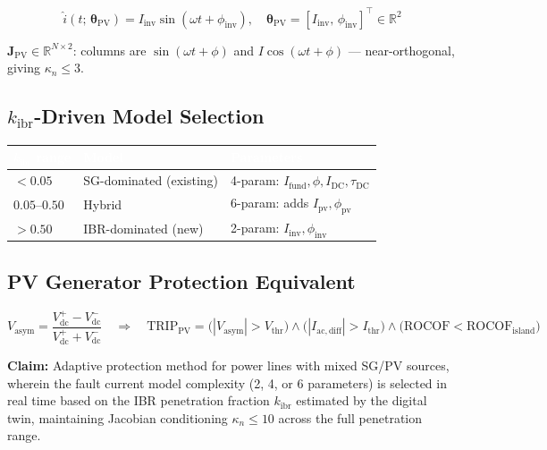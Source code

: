 \documentclass[12pt, a4paper]{report}
\newcommand{\vect}[1]{\boldsymbol{#1}}
\newcommand{\mat}[1]{\mathbf{#1}}
\begin{document}
\begin{equation}
  \hat{i}(t;\,\vect{\theta}_\mathrm{PV}) = I_\mathrm{inv}\sin(\omega t + \phi_\mathrm{inv}), \quad
  \vect{\theta}_\mathrm{PV} = [I_\mathrm{inv},\, \phi_\mathrm{inv}]^\top \in \mathbb{R}^2
\end{equation}

$\mat{J}_\mathrm{PV} \in \mathbb{R}^{N\times 2}$: columns are $\sin(\omega t + \phi)$ and $I\cos(\omega t + \phi)$ — near-orthogonal, giving $\kappa_n \le 3$.

\subsection{$k_\mathrm{ibr}$-Driven Model Selection}

\begin{center}
\renewcommand{\arraystretch}{1.3}
\begin{tabular}{C{2.5cm} L{3.5cm} L{4.5cm}}
\toprule
{} \textcolor{white}{\textbf{$k_\mathrm{ibr}$ range}} & \textcolor{white}{\textbf{Model}} & \textcolor{white}{\textbf{Parameters}} \\
\midrule
$< 0.05$ & SG-dominated (existing) & 4-param: $I_\mathrm{fund}, \phi, I_\mathrm{DC}, \tau_\mathrm{DC}$ \\
$0.05$--$0.50$ & Hybrid & 6-param: adds $I_\mathrm{pv}, \phi_\mathrm{pv}$ \\
$> 0.50$ & IBR-dominated (new) & 2-param: $I_\mathrm{inv}, \phi_\mathrm{inv}$ \\
\bottomrule
\end{tabular}
\end{center}

\subsection{PV Generator Protection Equivalent}

\begin{equation}
  V_\mathrm{asym} = \frac{V_\mathrm{dc}^+ - V_\mathrm{dc}^-}{V_\mathrm{dc}^+ + V_\mathrm{dc}^-}
  \quad\Rightarrow\quad
  \mathrm{TRIP_{PV}} = \bigl(|V_\mathrm{asym}| > V_\mathrm{thr}\bigr) \wedge \bigl(|I_\mathrm{ac,diff}| > I_\mathrm{thr}\bigr) \wedge \bigl(\mathrm{ROCOF} < \mathrm{ROCOF_{island}}\bigr)
\end{equation}

\begin{tcolorbox}[ipbox, title={IP — Patent Family P6}]
\textbf{Claim:} Adaptive protection method for power lines with mixed SG/PV sources, wherein the fault current model complexity (2, 4, or 6 parameters) is selected in real time based on the IBR penetration fraction $k_\mathrm{ibr}$ estimated by the digital twin, maintaining Jacobian conditioning $\kappa_n \le 10$ across the full penetration range.
\end{tcolorbox}
\end{document}
